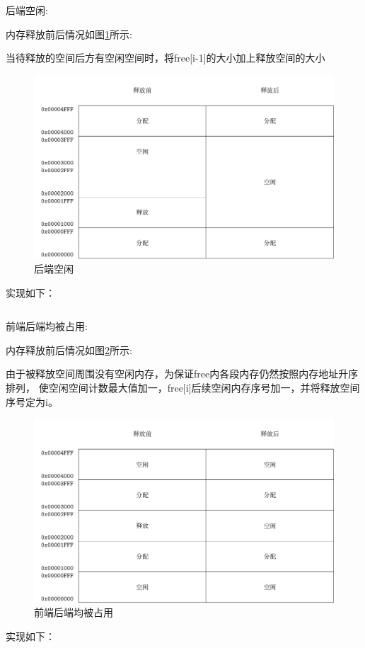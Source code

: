 \begin{listing}[H]
  \inputminted[tabsize=2, firstline=98, lastline=116,
  linenos=true]{c}{../ZOS/src/kernel/memory.c}
\end{listing}

\newpage
后端空闲:

内存释放前后情况如图\ref{fig:mem2}所示:

当待释放的空间后方有空闲空间时，将free[i-1]的大小加上释放空间的大小
\begin{figure}[h]
  \centering
  \includegraphics[width=.8\textwidth]{fig/mem2.pdf}
  \caption{后端空闲}
  \label{fig:mem2}
\end{figure}

实现如下：

\begin{listing}[H]
  \inputminted[tabsize=2, firstline=118, lastline=127,
  linenos=true]{c}{../ZOS/src/kernel/memory.c}
\end{listing}

\newpage
前端后端均被占用:

内存释放前后情况如图\ref{fig:mem3}所示:

由于被释放空间周围没有空闲内存，为保证free内各段内存仍然按照内存地址升序排列，
使空闲空间计数最大值加一，free[i]后续空闲内存序号加一，并将释放空间序号定为i。
\begin{figure}[h]
  \centering
  \includegraphics[width=.8\textwidth]{fig/mem3.pdf}
  \caption{前端后端均被占用}
  \label{fig:mem3}
\end{figure}

实现如下：
\begin{listing}[H]
  \inputminted[tabsize=2, firstline=128, lastline=141,
  linenos=true]{c}{../ZOS/src/kernel/memory.c}
\end{listing}